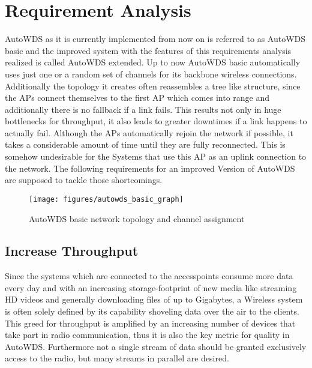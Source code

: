 \chapter{Requirement Analysis}
  AutoWDS as it is currently implemented from now on is referred to as AutoWDS basic and the improved system with the features of this requirements analysis realized 
  is called AutoWDS extended.
  Up to now AutoWDS basic automatically uses just one or a random set of channels for its backbone wireless connections. 
  Additionally the topology it creates often reassembles a tree like structure, since the APs connect themselves 
  to the first AP which comes into range and additionally there is no fallback if a link fails. This results not only in huge bottlenecks for throughput,
  it also leads to greater downtimes if a link happens to actually fail. Although the APs automatically rejoin the network if possible, it takes
  a considerable amount of time until they are fully reconnected. This is somehow undesirable for the Systems that use this AP as an uplink connection to
  the network. The following requirements for an improved Version of AutoWDS are supposed to tackle those shortcomings.
  
  \begin{figure}[h!]
    \centering
    \texttt{[image: figures/autowds\_basic\_graph]}
    \caption{AutoWDS basic network topology and channel assignment}
    \label{fig:autowds_basic_graph}
  \end{figure}

  \section{Increase Throughput}
  Since the systems which are connected to the accesspoints consume more data every day and with an increasing storage-footprint of new media like streaming HD videos
  and generally downloading files of up to Gigabytes, a Wireless system is often solely defined by its capability shoveling data over the air to the clients.
  This greed for throughput is amplified by an increasing number of devices that take part in radio communication, 
  thus it is also the key metric for quality in AutoWDS. Furthermore not a single stream of data should be granted exclusively access to the radio, but
  many streams in parallel are desired.
  
